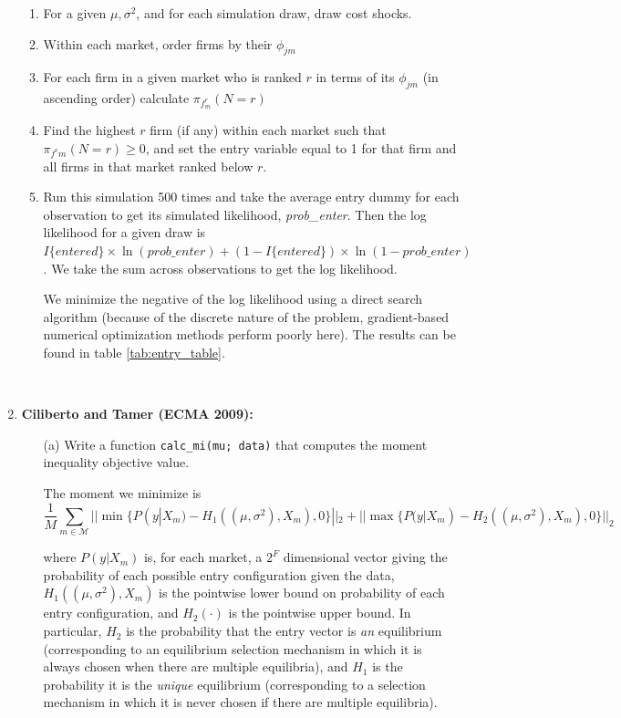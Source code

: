 \documentclass{article}
\begin{document}
\begin{enumerate}
\begin{answer}
\begin{enumerate}
\item For a given $\mu, \sigma^2$, and for each simulation draw, draw cost shocks.
\item Within each market, order firms by their $\phi_{jm}$
\item For each firm in a given market who is ranked $r$ in terms of its $\phi_{jm}$ (in ascending order) calculate $\pi_{f^{r}_m }(N=r)$
\item Find the highest $r$ firm (if any) within each market such that $\pi_{f^{r}m }(N=r) \geq 0$, and set the entry variable equal to 1 for that firm and all firms in that market ranked below $r$. 
\item 
Run this simulation 500 times and take the average entry dummy for each observation to get its simulated likelihood, \textit{prob\_enter}. Then the log likelihood for a given draw is $I\{entered\} \times \ln(prob\_enter) + (1-I\{entered\}) \times \ln (1-prob\_enter)$. We take the sum across observations to get the log likelihood. 

We minimize the negative of the log likelihood using a direct search algorithm (because of the discrete nature of the problem, gradient-based numerical optimization methods perform poorly here). The results can be found in table \ref{tab:entry_table}. 
\end{enumerate}

$\textit{}$


\end{answer}
\item \textbf{Ciliberto and Tamer (ECMA 2009):}
\begin{enumerate}
\item[(a)] Write a function \texttt{calc\_mi(mu; data)} that computes the moment inequality objective value.
\begin{answer}
The moment we minimize is 
$$
\frac{1}{M}\sum_{m\in \mathcal{M}}||\min \{P(y|X_m)-H_1((\mu,\sigma^2),X_m),0\}||_2 + ||\max \{P(y|X_m)-H_2((\mu,\sigma^2),X_m),0\}||_2
$$

where $P(y|X_m)$ is, for each market, a $2^F$ dimensional vector giving the probability of each possible entry configuration given the data, $H_1((\mu,\sigma^2),X_m)$ is the pointwise lower bound on probability of each entry configuration, and $H_2(\cdot)$ is the pointwise upper bound. In particular, $H_2$ is the probability that the entry vector is  \textit{an}  equilibrium (corresponding to an equilibrium selection mechanism in which it is always chosen when there are multiple equilibria), and $H_1$ is the probability it is the \textit{unique} equilibrium (corresponding to a selection mechanism in which it is never chosen if there are multiple equilibria).


\end{answer}
\end{enumerate}
\end{enumerate}
\end{document}
